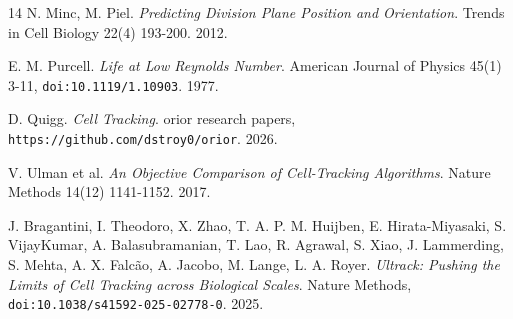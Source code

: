 \begin{thebibliography}{14}
N. Minc, M. Piel. \emph{Predicting Division Plane Position and Orientation}. Trends in Cell Biology 22(4) 193-200. 2012.

E. M. Purcell. \emph{Life at Low Reynolds Number}. American Journal of Physics 45(1) 3-11, \texttt{doi:10.1119/\allowbreak{}1.10903}. 1977.

D. Quigg. \emph{Cell Tracking}. orior research papers, \texttt{https:/\allowbreak{}/\allowbreak{}github.com/\allowbreak{}dstroy0/\allowbreak{}orior}. 2026.

V. Ulman et al. \emph{An Objective Comparison of Cell-Tracking Algorithms}. Nature Methods 14(12) 1141-1152. 2017.

J. Bragantini, I. Theodoro, X. Zhao, T. A. P. M. Huijben, E. Hirata-Miyasaki, S. VijayKumar, A. Balasubramanian, T. Lao, R. Agrawal, S. Xiao, J. Lammerding, S. Mehta, A. X. Falc\~ao, A. Jacobo, M. Lange, L. A. Royer. \emph{Ultrack: Pushing the Limits of Cell Tracking across Biological Scales}. Nature Methods, \texttt{doi:10.1038/\allowbreak{}s41592-025-02778-0}. 2025.

\end{thebibliography}
